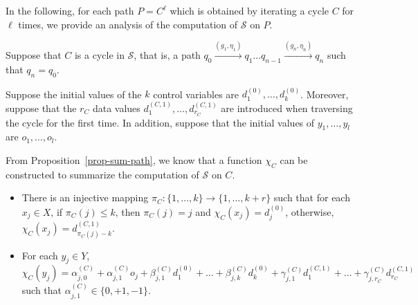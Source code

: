 \documentclass[runningheads,a4paper]{llncs}
\def\Ss{{\mathcal{S} }}
\begin{document}
In the following, for each path $P=C^{\ell}$ which is obtained by iterating a cycle $C$ for $\ell$ times, we provide an analysis of the computation of $\Ss$ on $P$.

Suppose that $C$ is a cycle in $\Ss$, that is, a path $q_0 \xrightarrow{(g_1,\eta_1)} q_1 \dots q_{n-1} \xrightarrow{(g_n, \eta_n)} q_n$ such that $q_n = q_0$.  

Suppose the initial values of the $k$ control variables are $d^{(0)}_1,\dots,d^{(0)}_k$. Moreover, suppose that the $r_C$ data values $d^{(C,1)}_{1},\dots,d^{(C,1)}_{r_C}$ are introduced when traversing the cycle for the first time. 
In addition, suppose that the initial values of $y_1,\dots, y_l$ are $o_1,\dots,o_l$. 

From Proposition~\ref{prop-sum-path}, we know that a function $\chi_C$ can be constructed to summarize the computation of $\Ss$ on $C$.
\begin{itemize}
\item There is an injective mapping $\pi_C: \{1,\dots,k\} \rightarrow \{1,\dots, k+r\}$ such that for each $x_j \in X$, if $\pi_C(j) \le k$, then $\pi_C(j)=j$ and $\chi_C(x_j)=d^{(0)}_{j}$, otherwise, $\chi_C(x_j)=d^{(C,1)}_{\pi_C(j)-k}$.
% 
\item For each $y_j \in Y$, $\chi_C(y_j) = \alpha^{(C)}_{j,0} + \alpha^{(C)}_{j,1} o_j + \beta^{(C)}_{j,1} d^{(0)}_1 + \dots + \beta^{(C)}_{j,k} d^{(0)}_k + \gamma^{(C)}_{j,1} d^{(C,1)}_1 +\dots + \gamma^{(C)}_{j,r_C} d^{(C,1)}_{r_C}$ such that $\alpha^{(C)}_{j,1} \in \{0,+1,-1\}$.
\end{itemize}
\end{document}
